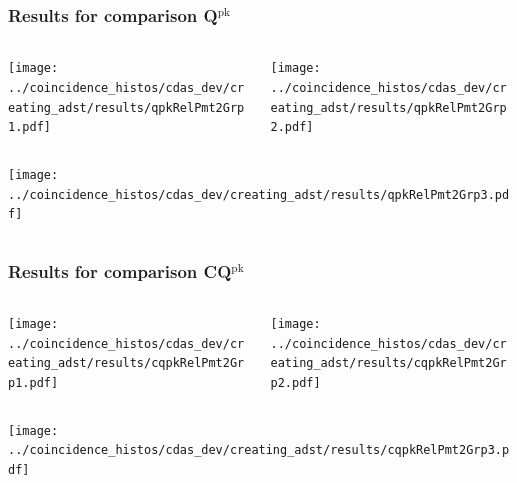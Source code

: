 \documentclass[aspectratio=169]{beamer}
\begin{document}
\begin{frame}
  \frametitle{Results for comparison Q$^{\mathrm{pk}}$}

  \begin{columns}
    \centering
    \begin{column}{0.5\textwidth}
      \texttt{[image: ../coincidence\_histos/cdas\_dev/creating\_adst/results/qpkRelPmt2Grp1.pdf]}
    \end{column}
    \begin{column}{0.5\textwidth}
      \texttt{[image: ../coincidence\_histos/cdas\_dev/creating\_adst/results/qpkRelPmt2Grp2.pdf]}
    \end{column}
  \end{columns}

  \begin{columns}
    \centering
    \begin{column}{0.5\textwidth}
      \texttt{[image: ../coincidence\_histos/cdas\_dev/creating\_adst/results/qpkRelPmt2Grp3.pdf]}
    \end{column}
  \end{columns}
\end{frame}

\begin{frame}
  \frametitle{Results for comparison CQ$^{\mathrm{pk}}$}

  \begin{columns}
    \centering
    \begin{column}{0.5\textwidth}
      \texttt{[image: ../coincidence\_histos/cdas\_dev/creating\_adst/results/cqpkRelPmt2Grp1.pdf]}
    \end{column}
    \begin{column}{0.5\textwidth}
      \texttt{[image: ../coincidence\_histos/cdas\_dev/creating\_adst/results/cqpkRelPmt2Grp2.pdf]}
    \end{column}
  \end{columns}

  \begin{columns}
    \centering
    \begin{column}{0.5\textwidth}
      \texttt{[image: ../coincidence\_histos/cdas\_dev/creating\_adst/results/cqpkRelPmt2Grp3.pdf]}
    \end{column}
  \end{columns}
\end{frame}
\end{document}
